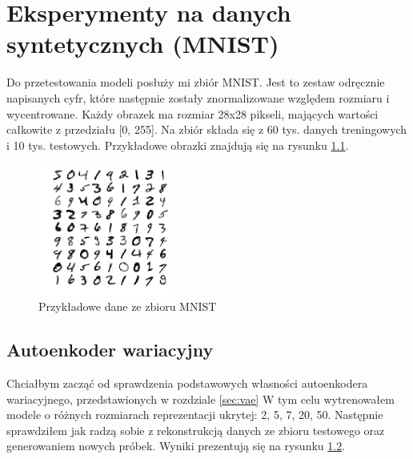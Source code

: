 \chapter{Eksperymenty na danych syntetycznych (MNIST)}

Do przetestowania modeli posłuży mi zbiór MNIST. Jest to zestaw odręcznie napisanych cyfr, które następnie zostały znormalizowane względem rozmiaru i wycentrowane. Każdy obrazek ma rozmiar 28x28 pikseli, mających wartości całkowite z przedziału [0, 255]. Na zbiór składa się z 60 tys. danych treningowych i 10 tys. testowych. Przykładowe obrazki znajdują się na rysunku \ref{fig:mnist}.

\begin{figure}[h!]
    \centering
    \includegraphics[width=0.4\textwidth]{images/mnist_v2}
    \caption{Przykładowe dane ze zbioru MNIST}
    \label{fig:mnist}
\end{figure}

\section{Autoenkoder wariacyjny}

Chciałbym zacząć od sprawdzenia podstawowych własności autoenkodera wariacyjnego, przedstawionych w rozdziale \ref{sec:vae} W tym celu wytrenowałem modele o różnych rozmiarach reprezentacji ukrytej: 2, 5, 7, 20, 50. Następnie sprawdziłem jak radzą sobie z rekonstrukcją danych ze zbioru testowego oraz generowaniem nowych próbek. Wyniki prezentują się na rysunku \ref{fig:mnist_recon}. 

\begin{figure}[h!]
  \centering
  \begin{subfigure}[b]{0.45\linewidth}
    \caption{}
  \end{subfigure}
  \begin{subfigure}[b]{0.45\linewidth}
    \caption{}
  \end{subfigure}
  \begin{subfigure}[b]{0.45\linewidth}
    \caption{}
  \end{subfigure}
  \caption{}
  \label{fig:mnist_recon}
\end{figure}

